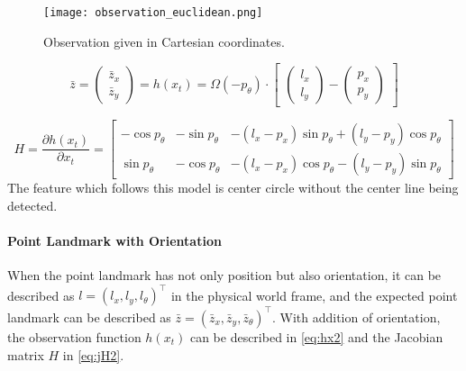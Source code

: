 \begin{figure}[h!]
  \centering
  \texttt{[image: observation\_euclidean.png]}
  \caption[Observation given in Cartesian coordinates.]{Observation given in Cartesian coordinates. \cite{Tasse2013}}
  \label{fig:observation_euclidean}
\end{figure}

\begin{equation}\label{eq:hx}
  \bar{z} = \begin{pmatrix}
\bar{z}_{x}\\ 
\bar{z}_{y}
\end{pmatrix}
= 
h(x_t)
=
\Omega(-p_{\theta})
\cdot
\begin{bmatrix}
 \begin{pmatrix}
l_{x}\\ 
l_{y}
\end{pmatrix}
-
\begin{pmatrix}
p_{x}\\ 
p_{y}
\end{pmatrix}
\end{bmatrix}
\end{equation}

\begin{equation}\label{eq:jH}
H =
\frac{\partial h(x_t)}{\partial x_t}
=
\begin{bmatrix}
  -\cos{p_{\theta}} & -\sin{p_{\theta}} & -(l_x-p_x)\sin{p_{\theta}} + (l_y-p_y)\cos{p_{\theta}} \\ 
  \sin{p_{\theta}} & -\cos{p_{\theta}} & -(l_x-p_x)\cos{p_{\theta}} - (l_y-p_y)\sin{p_{\theta}} 
\end{bmatrix}
\end{equation}
The feature which follows this model is center circle without the center line being detected.

\paragraph{Point Landmark with Orientation}\label{par:pointLandmark}
When the point landmark has not only position but also orientation, it can be described as $l = (l_x, l_y, l_{\theta})^\top$ in the physical world frame, and the expected point landmark can be described as $\bar{z} = (\bar{z}_x, \bar{z}_y, \bar{z}_{\theta})^\top$.  With addition of orientation, the observation function $h(x_t)$ can be described in \autoref{eq:hx2} and the Jacobian matrix $H$ in \autoref{eq:jH2}.

